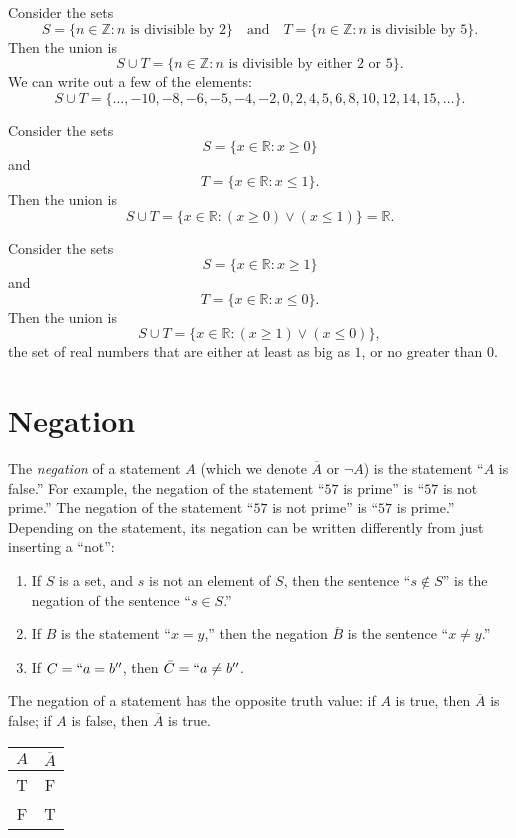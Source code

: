 \documentclass[11pt,dvipsnames]{book}
\numberwithin{figure}{section} %
\numberwithin{table}{section} %
\begin{document}
\begin{example}
Consider the sets
\[
    S = \{n \in \mathbb{Z} : n\text{ is divisible by }2\}\quad \text{and}\quad T = \{n \in \mathbb{Z} : n\text{ is divisible by }5\}.
\]
Then the union is
\[
    S \cup T = \{n \in \mathbb{Z} : n\text{ is divisible by either }2\text{ or }5\}.
\]
We can write out a few of the elements:
\[
    S \cup T =\{\dots,-10,-8,-6,-5,-4,-2,0,2,4,5,6,8,10,12,14,15,\dots\}.
\]
\end{example}

\begin{example}
Consider the sets
\[
    S = \{x \in \mathbb{R} : x \geq 0\}
\]
and
\[
    T = \{x \in \mathbb{R} : x \leq 1\}.
\]
Then the union is
\[
    S \cup T = \{x \in \mathbb{R} : (x \geq 0) \vee (x \leq 1) \} = \mathbb{R}.
\]
\end{example}

\begin{example}
Consider the sets
\[
    S = \{x \in \mathbb{R} : x \geq 1\}
\]
and
\[
    T = \{x \in \mathbb{R} : x \leq 0\}.
\]
Then the union is
\[
    S \cup T = \{x \in \mathbb{R} : (x \geq 1)\vee(x \leq 0) \},
\]
the set of real numbers that are either at least as big as $1$, or no greater than $0$.
\end{example}

\section{Negation}%
\label{negation}

The \emph{negation} of a statement $A$ (which we denote $\overline{A}$ or $\neg A$) is the statement ``$A$ is false.''
For example, the negation of the statement ``$57$ is prime'' is ``$57$ is not prime.''
The negation of the statement ``$57$ is not prime'' is ``$57$ is prime.''
Depending on the statement, its negation can be written differently from just inserting a ``not'':
\begin{enumerate}[label=(\alph*)]
\item If $S$ is a set, and $s$ is not an element of $S$, then the sentence ``$s \notin S$'' is the negation of the sentence ``$s \in S$.''
\item If $B$ is the statement ``$x = y$,'' then the negation $\overline{B}$ is the sentence ``$x \neq y$.''
\item If $C=``a=b''$, then $\bar{C}=``a\neq b''$.
\end{enumerate}

The negation of a statement has the opposite truth value: if $A$ is true, then $\overline{A}$ is false; if $A$ is false, then $\overline{A}$ is true.
\begin{center}
    \begin{tabular}{ c|c}
        $A$ & $\overline{A}$   \\ \hline
        T & F \\
        F & T \\
    \end{tabular}
\end{center}
\end{document}
